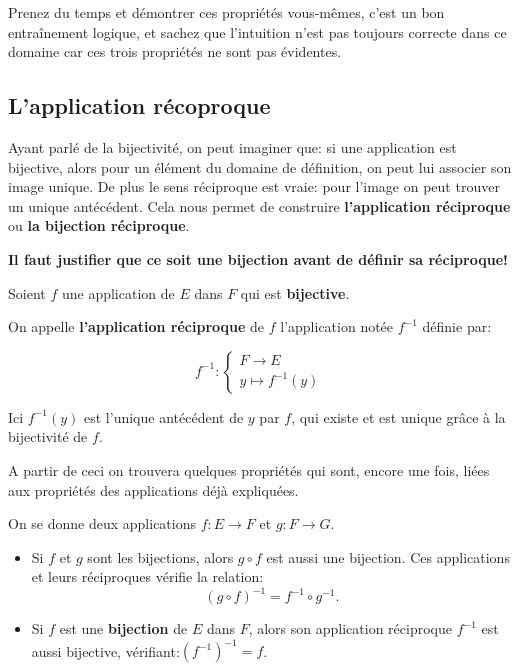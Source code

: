 \documentclass{article}
\begin{document}
Prenez du temps et démontrer ces propriétés vous-mêmes, c'est un bon entraînement logique, et sachez que l'intuition n'est pas toujours correcte dans ce domaine car ces trois propriétés ne sont pas évidentes.

\subsection{L'application récoproque}

Ayant parlé de la bijectivité, on peut imaginer que: si une application est bijective, alors pour un élément du domaine de définition, on peut lui associer son image unique. De plus le sens réciproque est vraie: pour l'image on peut trouver un unique antécédent. Cela nous permet de construire \textbf{l'application réciproque} ou \textbf{la bijection réciproque}.

\textbf{Il faut justifier que ce soit une bijection avant de définir sa réciproque!}

\begin{tcolorbox}[colback=red!5!white,colframe=red!75!black,title=Définition 3.7]

Soient $f$ une application de $E$ dans $F$ qui est \textbf{bijective}.

On appelle \textbf{l'application réciproque} de  $f$ l'application notée $f^{-1}$ définie par:

\[ 
f^{-1} :
\begin{cases}
F \to E \\ 
y \mapsto f^{-1}(y)
\end{cases}
\]

Ici $f^{-1}(y)$ est l'unique antécédent de $y$ par $f$, qui existe et est unique grâce à la bijectivité de $f$.

\end{tcolorbox}


A partir de ceci on trouvera quelques propriétés qui sont, encore une fois, liées aux propriétés des applications déjà expliquées.

\begin{tcolorbox}[colback=blue!5!white,colframe=blue!75!black,title=Propriété 3.3]



On se donne deux applications $f : E \to F$ et $g : F \to G$.

\begin{itemize}
    \item Si $f$ et $g$ sont les bijections, alors $g \circ f$ est aussi une bijection. Ces applications et leurs réciproques vérifie la relation: 
    \[
    (g \circ f)^{-1} = f^{-1} \circ g^{-1}.
    \]

    \item Si $f$ est une \textbf{bijection} de $E$ dans $F$, alors son application réciproque $f^{-1}$ est aussi bijective, vérifiant:$(f^{-1})^{-1} = f$.

\end{itemize}



\end{tcolorbox} 
\end{document}
